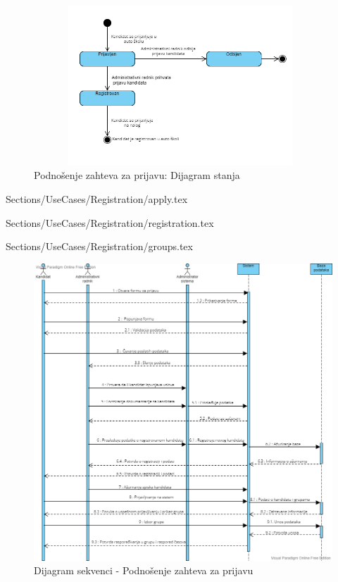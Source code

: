\begin{figure}[H]
    \begin{center}
        \includegraphics[width=110mm, height=60mm]{Diagrams/dijagram_stanja_registracija.png}
    \end{center}
    \caption {Podnošenje zahteva za prijavu: Dijagram stanja}
    \label{fig:stanja_kandidat_registracija}

\end{figure}

 {Sections/UseCases/Registration/apply.tex}

 {Sections/UseCases/Registration/registration.tex}

 {Sections/UseCases/Registration/groups.tex}


\begin{figure}[H]
    \begin{center}
        \includegraphics[width= 120mm]{Diagrams/dijagram_sekvence_podnosenje_zahteva.png}
    \end{center}
    \caption {Dijagram sekvenci - Podnošenje zahteva za prijavu}
    \label{fig:sekvenci_podnosenje_zahteva}

\end{figure}

